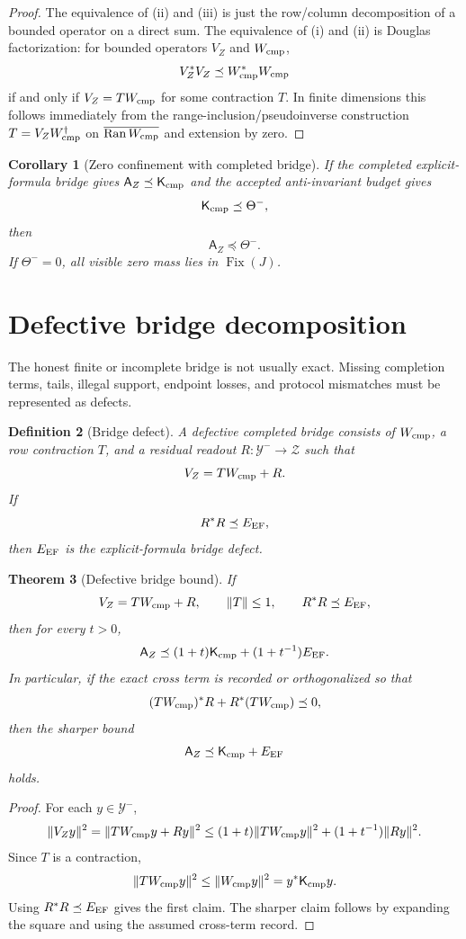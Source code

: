\documentclass[11pt]{article}
\newtheorem{theorem}{Theorem}[section]
\newtheorem{definition}[theorem]{Definition}
\newtheorem{corollary}[theorem]{Corollary}
\newcommand{\K}{\mathsf K}
\newcommand{\A}{\mathsf A}
\newcommand{\Y}{\mathcal Y}
\newcommand{\Fix}{\operatorname{Fix}}
\newcommand{\Ran}{\operatorname{Ran}}
\begin{document}
\begin{proof}
The equivalence of (ii) and (iii) is just the row/column decomposition of a bounded operator on a direct sum. The equivalence of (i) and (ii) is Douglas factorization: for bounded operators \(V_Z\) and \(W_{\rm cmp}\),
\[
  V_Z^*V_Z\preceq W_{\rm cmp}^*W_{\rm cmp}
\]
if and only if \(V_Z=T W_{\rm cmp}\) for some contraction \(T\). In finite dimensions this follows immediately from the range-inclusion/pseudoinverse construction \(T=V_ZW_{\rm cmp}^\dagger\) on \(\overline{\Ran W_{\rm cmp}}\) and extension by zero.
\end{proof}

\begin{corollary}[Zero confinement with completed bridge]
If the completed explicit-formula bridge gives \(\A_Z\preceq\K_{\rm cmp}\) and the accepted anti-invariant budget gives
\[
  \K_{\rm cmp}\preceq\Theta^-,
\]
then
\[
  \A_Z\preceq\Theta^-.
\]
If \(\Theta^-=0\), all visible zero mass lies in \(\Fix(J)\).
\end{corollary}

\section{Defective bridge decomposition}

The honest finite or incomplete bridge is not usually exact. Missing completion terms, tails, illegal support, endpoint losses, and protocol mismatches must be represented as defects.

\begin{definition}[Bridge defect]
A defective completed bridge consists of \(W_{\rm cmp}\), a row contraction \(T\), and a residual readout \(R:\Y^-\to\mathcal Z\) such that
\[
  V_Z=T W_{\rm cmp}+R.
\]
If
\[
  R^*R\preceq E_{\rm EF},
\]
then \(E_{\rm EF}\) is the explicit-formula bridge defect.
\end{definition}

\begin{theorem}[Defective bridge bound]
If
\[
  V_Z=T W_{\rm cmp}+R,
  \qquad \|T\|\le1,
  \qquad R^*R\preceq E_{\rm EF},
\]
then for every \(t>0\),
\[
  \A_Z\preceq (1+t)\K_{\rm cmp}+(1+t^{-1})E_{\rm EF}.
\]
In particular, if the exact cross term is recorded or orthogonalized so that
\[
  (TW_{\rm cmp})^*R+R^*(TW_{\rm cmp})\preceq0,
\]
then the sharper bound
\[
  \A_Z\preceq \K_{\rm cmp}+E_{\rm EF}
\]
holds.
\end{theorem}

\begin{proof}
For each \(y\in\Y^-\),
\[
  \|V_Zy\|^2=\|TW_{\rm cmp}y+Ry\|^2
  \le (1+t)\|TW_{\rm cmp}y\|^2+(1+t^{-1})\|Ry\|^2.
\]
Since \(T\) is a contraction,
\[
  \|TW_{\rm cmp}y\|^2\le \|W_{\rm cmp}y\|^2=y^*\K_{\rm cmp}y.
\]
Using \(R^*R\preceq E_{\rm EF}\) gives the first claim. The sharper claim follows by expanding the square and using the assumed cross-term record.
\end{proof}
\end{document}
